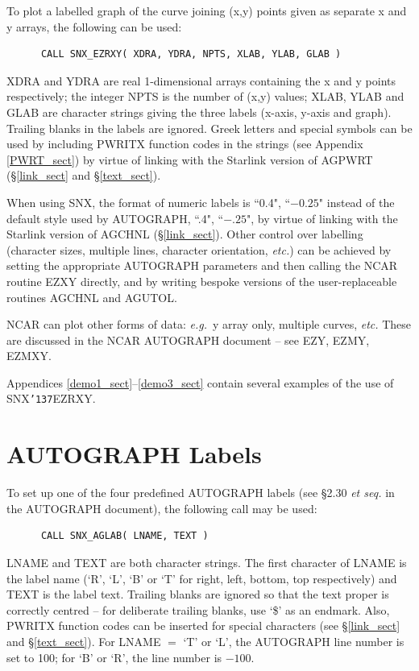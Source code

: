 \documentclass[11pt]{article}
\renewcommand{\_}{{\tt\char'137}}     %
\begin{document}
To plot a labelled graph of the curve joining (x,y) points given as separate x
and y arrays, the following can be used:

\begin{verbatim}
      CALL SNX_EZRXY( XDRA, YDRA, NPTS, XLAB, YLAB, GLAB )
\end{verbatim}

XDRA and YDRA are real 1-dimensional arrays containing the x and y points
respectively; the integer NPTS is the number of (x,y) values; XLAB, YLAB and
GLAB are character strings giving the three labels (x-axis, y-axis and graph).
Trailing blanks in the labels are ignored.
Greek letters and special symbols can be used by including PWRITX function
codes in the strings (see Appendix \ref{PWRT_sect}) by virtue of linking with 
the Starlink version of AGPWRT (\S\ref{link_sect} and \S\ref{text_sect}).

When using SNX, the format of numeric labels is ``0.4", ``$-0.25$" instead of
the default style used by AUTOGRAPH, ``.4", ``$-.25$", by virtue of linking
with the Starlink version of AGCHNL (\S\ref{link_sect}).
Other control over labelling (character sizes, multiple lines, character
orientation, {\em etc.}) can be achieved by setting the appropriate AUTOGRAPH
parameters and then calling the NCAR routine EZXY directly, and by writing
bespoke versions of the user-replaceable routines AGCHNL and AGUTOL.

NCAR can plot other forms of data: {\em e.g.}\ y array only, multiple curves,
{\em etc.}
These are discussed in the NCAR AUTOGRAPH document -- see EZY, EZMY, EZMXY.

Appendices \ref{demo1_sect}--\ref{demo3_sect} contain several examples of the
use of SNX\_EZRXY.


\section {AUTOGRAPH Labels}

To set up one of the four predefined AUTOGRAPH labels (see \S 2.30 {\em et
seq.} in the AUTOGRAPH document), the following call may be used:

\begin{verbatim}
      CALL SNX_AGLAB( LNAME, TEXT )
\end{verbatim}

LNAME and TEXT are both character strings.
The first character of LNAME is the label name (`R', `L', `B' or `T' for
right, left, bottom, top respectively) and TEXT is the label text.
Trailing blanks are ignored so that the text proper is correctly centred --
for deliberate trailing blanks, use `\$' as an endmark.
Also, PWRITX function codes can be inserted for special characters (see
\S\ref{link_sect} and \S\ref{text_sect}).
For LNAME $=$ `T' or `L', the AUTOGRAPH line number is set to 100; for `B' or
`R', the line number is $-100$.
\end{document}
